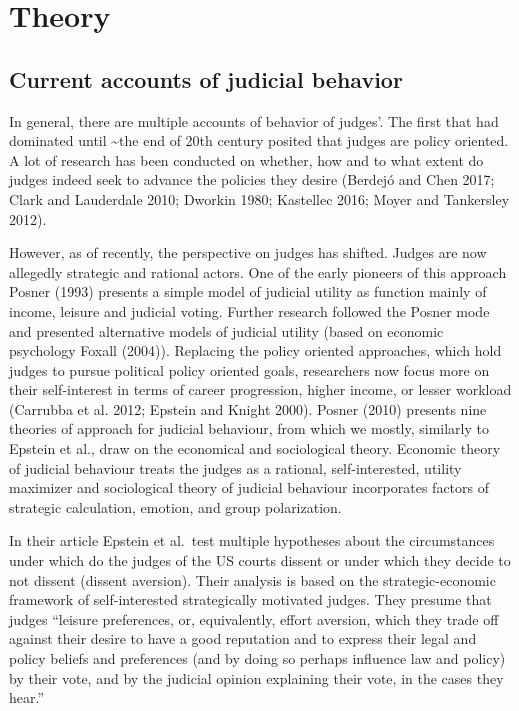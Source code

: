 \documentclass[
  11pt,
]{article}
\begin{document}
\hypertarget{theory}{%
\section{Theory}\label{theory}}

\hypertarget{current-accounts-of-judicial-behavior}{%
\subsection{Current accounts of judicial
behavior}\label{current-accounts-of-judicial-behavior}}

In general, there are multiple accounts of behavior of judges'. The
first that had dominated until \textasciitilde the end of 20th century
posited that judges are policy oriented. A lot of research has been
conducted on whether, how and to what extent do judges indeed seek to
advance the policies they desire (Berdejó and Chen 2017; Clark and
Lauderdale 2010; Dworkin 1980; Kastellec 2016; Moyer and Tankersley
2012).

However, as of recently, the perspective on judges has shifted. Judges
are now allegedly strategic and rational actors. One of the early
pioneers of this approach Posner (1993) presents a simple model of
judicial utility as function mainly of income, leisure and judicial
voting. Further research followed the Posner mode and presented
alternative models of judicial utility (based on economic psychology
Foxall (2004)). Replacing the policy oriented approaches, which hold
judges to pursue political policy oriented goals, researchers now focus
more on their self-interest in terms of career progression, higher
income, or lesser workload (Carrubba et al. 2012; Epstein and Knight
2000). Posner (2010) presents nine theories of approach for judicial
behaviour, from which we mostly, similarly to Epstein et al., draw on
the economical and sociological theory. Economic theory of judicial
behaviour treats the judges as a rational, self-interested, utility
maximizer and sociological theory of judicial behaviour incorporates
factors of strategic calculation, emotion, and group polarization.

In their article Epstein et al.~test multiple hypotheses about the
circumstances under which do the judges of the US courts dissent or
under which they decide to not dissent (dissent aversion). Their
analysis is based on the strategic-economic framework of self-interested
strategically motivated judges. They presume that judges ``leisure
preferences, or, equivalently, effort aversion, which they trade off
against their desire to have a good reputation and to express their
legal and policy beliefs and preferences (and by doing so perhaps
influence law and policy) by their vote, and by the judicial opinion
explaining their vote, in the cases they hear.''
\end{document}
